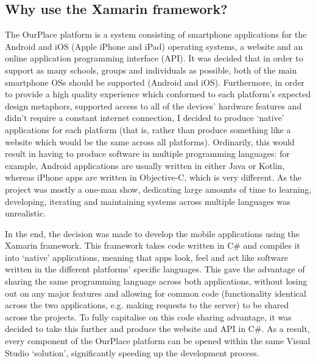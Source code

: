 \subsection{Why use the Xamarin framework?}
The OurPlace platform is a system consisting of smartphone applications for the
Android and iOS (Apple iPhone and iPad) operating systems, a website and an
online application programming interface (API). It was decided that in order to
support as many schools, groups and individuals as possible, both of the main
smartphone OSs should be supported (Android and iOS). Furthermore, in order to
provide a high quality experience which conformed to each platform's expected
design metaphors,  supported access to all of the devices' hardware features and
didn't require a constant internet connection, I decided to produce `native'
applications for each platform (that is, rather than produce something like a
website which would be the same across all platforms). Ordinarily, this would
result in having to produce software in multiple programming languages: for
example, Android applications are usually written in either Java or Kotlin,
whereas iPhone apps are written in Objective-C, which is very different. As the
project was mostly a one-man show, dedicating large amounts of time to learning,
developing, iterating and maintaining systems across multiple languages was
unrealistic. 

In the end, the decision was made to develop the mobile applications using the
Xamarin framework. This framework takes code written in C\# and compiles it into
`native' applications, meaning that apps look, feel and act like software
written in the different platforms' specific languages. This gave the advantage
of sharing the same programming language across both applications, without
losing out on any major features and allowing for common code (functionality
identical across the two applications, e.g. making requests to the server) to be
shared across the projects. To fully capitalise on this code sharing advantage,
it was decided to take this further and produce the website and API in C\#. As a
result, every component of the OurPlace platform can be opened within the same
Visual Studio `solution', significantly speeding up the development process.

